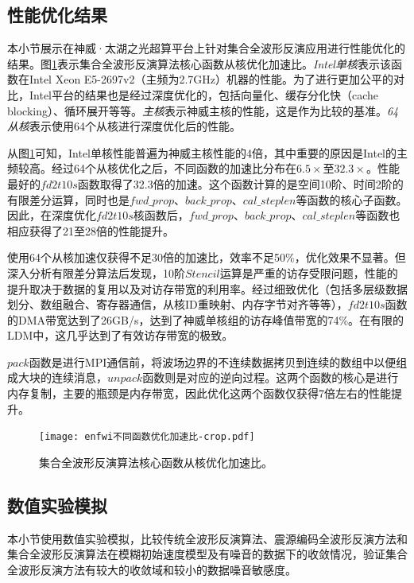 \subsection{性能优化结果}

本小节展示在神威·太湖之光超算平台上针对集合全波形反演应用进行性能优化的结果。图\ref{fig:集合全波形反演算法核心函数从核优化加速比}表示集合全波形反演算法核心函数从核优化加速比。\emph{Intel单核}表示该函数在Intel Xeon E5-2697v2（主频为2.7GHz）机器的性能。为了进行更加公平的对比，Intel平台的结果也是经过深度优化的，包括向量化、缓存分化快（cache blocking）、循环展开等等。\emph{主核}表示神威主核的性能，这是作为比较的基准。\emph{64从核}表示使用64个从核进行深度优化后的性能。

从图\ref{fig:集合全波形反演算法核心函数从核优化加速比}可知，Intel单核性能普遍为神威主核性能的4倍，其中重要的原因是Intel的主频较高。经过64个从核优化之后，不同函数的加速比分布在$6.5\times$至$32.3\times$。性能最好的$fd2t10s$函数取得了32.3倍的加速。这个函数计算的是空间10阶、时间2阶的有限差分运算，同时也是$fwd\_prop$、$back\_prop$、$cal\_steplen$等函数的核心子函数。因此，在深度优化$fd2t10s$核函数后，$fwd\_prop$、$back\_prop$、$cal\_steplen$等函数也相应获得了21至28倍的性能提升。

使用64个从核加速仅获得不足30倍的加速比，效率不足50\%，优化效果不显著。但深入分析有限差分算法后发现，10阶$Stencil$运算是严重的访存受限问题，性能的提升取决于数据的复用以及对访存带宽的利用率。经过细致优化（包括多层级数据划分、数组融合、寄存器通信，从核ID重映射、内存字节对齐等等），$fd2t10s$函数的DMA带宽达到了26GB/s，达到了神威单核组的访存峰值带宽的74\%。在有限的LDM中，这几乎达到了有效访存带宽的极致。

$pack$函数是进行MPI通信前，将波场边界的不连续数据拷贝到连续的数组中以便组成大块的连续消息，$unpack$函数则是对应的逆向过程。这两个函数的核心是进行内存复制，主要的瓶颈是内存带宽，因此优化这两个函数仅获得7倍左右的性能提升。

\begin{figure}[ht]
\centering
\texttt{[image: enfwi不同函数优化加速比-crop.pdf]}
\caption{集合全波形反演算法核心函数从核优化加速比。}
\label{fig:集合全波形反演算法核心函数从核优化加速比}
\end{figure}


\subsection{数值实验模拟}
本小节使用数值实验模拟，比较传统全波形反演算法、震源编码全波形反演方法和集合全波形反演算法在模糊初始速度模型及有噪音的数据下的收敛情况，验证集合全波形反演方法有较大的收敛域和较小的数据噪音敏感度。

